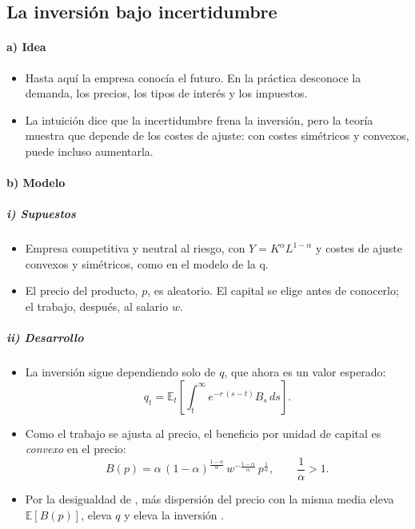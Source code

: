 \documentclass[11pt]{article}
\begin{document}
\subsection{La inversión bajo incertidumbre}\label{sec:incertidumbre}

\paragraph{a) Idea}

\begin{itemize}
\item Hasta aquí la empresa conocía el futuro. En la práctica desconoce la demanda, los precios, los tipos de interés y los impuestos.
\item La intuición dice que la incertidumbre frena la inversión, pero la teoría muestra que depende de los costes de ajuste: con costes simétricos y convexos, puede incluso aumentarla\nocite{Hartman1972Effects,Abel1983Optimal}.
\end{itemize}

\paragraph{b) Modelo}

\subparagraph{i) Supuestos}

\begin{itemize}
\item Empresa competitiva y neutral al riesgo, con $Y=K^{\alpha}L^{1-\alpha}$ y costes de ajuste convexos y simétricos, como en el modelo de la q.
\item El precio del producto, $p$, es aleatorio. El capital se elige antes de conocerlo; el trabajo, después, al salario $w$.
\end{itemize}

\subparagraph{ii) Desarrollo}

\begin{itemize}
\item La inversión sigue dependiendo solo de $q$, que ahora es un valor esperado:
  \begin{equation*}
  q_t=\mathbb{E}_t\left[\int_t^{\infty}e^{-r\,(s-t)}B_s\,ds\right].
  \end{equation*}
\item Como el trabajo se ajusta al precio, el beneficio por unidad de capital es \emph{convexo} en el precio:
  \begin{equation*}
  B(p)=\alpha\,(1-\alpha)^{\frac{1-\alpha}{\alpha}}\,w^{-\frac{1-\alpha}{\alpha}}\,p^{\frac{1}{\alpha}},\qquad \frac{1}{\alpha}>1.
  \end{equation*}
\item Por la desigualdad de , más dispersión del precio con la misma media eleva $\mathbb{E}[B(p)]$, eleva $q$ y eleva la inversión .
\end{itemize}
\end{document}
